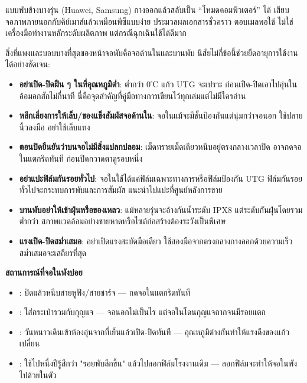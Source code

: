 
แบบพับข้างบางรุ่น (Huawei, Samsung) กางออกแล้วสลับเป็น “โหมดคอมพิวเตอร์” ได้ เสียบจอภาพภายนอกกับคีย์เมาส์แล้วเหมือนพีซีแบบง่าย ประมวลผลเอกสารชั่วคราว ตอบเมลพอใช้ ไม่ใช่เครื่องมือทำงานหลักระดับผลิตภาพ แต่กรณีฉุกเฉินใช้ได้ดีมาก


สิ่งที่แพงและบอบบางที่สุดของหน้าจอพับคือจอด้านในและบานพับ นิสัยไม่กี่ข้อนี้ช่วยยืดอายุการใช้งานได้อย่างชัดเจน:

\begin{itemize}
  \item \textbf{อย่าเปิด-ปิดฝืน ๆ ในที่อุณหภูมิต่ำ}: ต่ำกว่า 0℃ แก้ว UTG จะเปราะ ก่อนเปิด-ปิดเอาไปอุ่นในอ้อมอกสักไม่กี่นาที นี่คือจุดสำคัญที่คู่มือทางการเขียนไว้ทุกเล่มแต่ไม่มีใครอ่าน
  \item \textbf{หลีกเลี่ยงการให้เล็บ/ของแข็งสัมผัสจอด้านใน}: จอในแม้จะมีชั้นป้องกันแต่นุ่มกว่าจอนอก ใช้ปลายนิ้วลงมือ อย่าใช้เล็บแทง
  \item \textbf{ตอนปิดยืนยันว่าบนจอไม่มีสิ่งแปลกปลอม}: เม็ดทรายเม็ดเดียวหนีบอยู่ตรงกลางเวลาปิด อาจกดจอในแตกริดทันที ก่อนปิดกวาดตาดูรอบหนึ่ง
  \item \textbf{อย่าแปะฟิล์มกันรอยทั่วไป}: จอในใช้ได้แค่ฟิล์มเฉพาะทางการหรือฟิล์มป้องกัน UTG ฟิล์มกันรอยทั่วไปจะกระทบการพับและการสัมผัส แนะนำไปแปะที่ศูนย์หลังการขาย
  \item \textbf{บานพับอย่าให้เข้าฝุ่นหรือของเหลว}: แม้หลายรุ่นจะอ้างกันน้ำระดับ IPX8 แต่ระดับกันฝุ่นโดยรวมต่ำกว่า สภาพแวดล้อมอย่างชายหาดหรือไซต์ก่อสร้างต้องระวังเป็นพิเศษ
  \item \textbf{แรงเปิด-ปิดสม่ำเสมอ}: อย่าเปิดแรงสะบัดมือเดียว ใช้สองมือจากตรงกลางกางออกด้วยความเร็วสม่ำเสมอจะเสถียรที่สุด
\end{itemize}

\textbf{สถานการณ์ที่จอในพังบ่อย}\par

\begin{itemize}
  \item : ปิดแล้วหนีบสายหูฟัง/สายชาร์จ — กดจอในแตกริดทันที
  \item : ใส่กระเป๋ารวมกับกุญแจ — จอนอกไม่เป็นไร แต่จอในโดนกุญแจถากจนมีรอยแตก
  \item : วันหนาวเดินเข้าห้องอุ่นจากที่เย็นแล้วเปิด-ปิดทันที — อุณหภูมิต่างกันทำให้แรงดึงของแก้วเปลี่ยน
  \item : ใช้ไปหนึ่งปีรู้สึกว่า "รอยพับลึกขึ้น" แล้วไปลอกฟิล์มโรงงานเดิม — ลอกฟิล์มจะทำให้จอในพังไปด้วยในตัว
\end{itemize}

